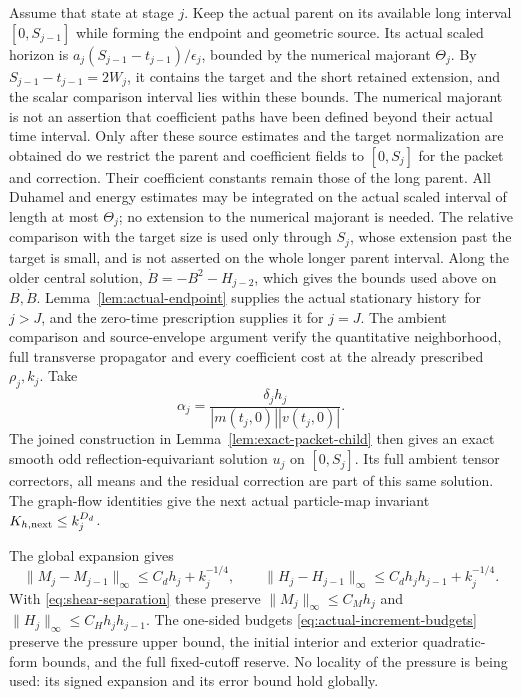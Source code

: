 Assume that state at stage $j$. Keep the actual parent on its available
long interval $[0,S_{j-1}]$ while forming the endpoint and geometric
source. Its actual scaled horizon is
$a_j(S_{j-1}-t_{j-1})/\epsilon_j$, bounded by the numerical majorant
$\Theta_j$. By $S_{j-1}-t_{j-1}=2W_j$, it contains the target and the
short retained extension, and the scalar comparison interval lies within these bounds.
The numerical majorant is not an assertion that coefficient paths have
been defined beyond their actual time interval. Only after these source
estimates and the target normalization are obtained do we restrict the
parent and coefficient fields to $[0,S_j]$ for the packet and correction.
Their coefficient constants remain those of the long parent.
All Duhamel and energy estimates may be integrated on the actual scaled
interval of length at most $\Theta_j$; no extension to the numerical
majorant is needed. The relative comparison with the target size is
used only through $S_j$, whose extension past the target is small,
and is not asserted on the whole longer parent interval. Along the
older central solution,
$\dot B=-B^2-H_{j-2}$, which gives the bounds used above on $B,\dot B$.
Lemma~\ref{lem:actual-endpoint} supplies the actual stationary history
for $j>J$, and the zero-time prescription supplies it for $j=J$.
The ambient comparison and source-envelope argument verify the
quantitative neighborhood, full transverse propagator and every
coefficient cost at the already prescribed $\rho_j,k_j$.
Take
\[
 \alpha_j=\frac{\delta_jh_j}{|m(t_j,0)||v(t_j,0)|}.
\]
The joined construction in Lemma~\ref{lem:exact-packet-child} then gives
an exact smooth odd reflection-equivariant solution $u_j$ on $[0,S_j]$.
Its full ambient tensor correctors, all means and the residual correction
are part of this same solution. The graph-flow identities give the
next actual particle-map invariant $K_{h,\rm next}\leq k_j^{D_d}$.

The global expansion gives
\[
 \|M_j-M_{j-1}\|_\infty\leq C_dh_j+k_j^{-1/4},\qquad
 \|H_j-H_{j-1}\|_\infty\leq C_dh_jh_{j-1}+k_j^{-1/4}.
\]
With \eqref{eq:shear-separation} these preserve
$\|M_j\|_\infty\leq C_Mh_j$ and
$\|H_j\|_\infty\leq C_Hh_jh_{j-1}$.
The one-sided budgets \eqref{eq:actual-increment-budgets} preserve the
pressure upper bound, the initial interior and exterior quadratic-form
bounds, and the full fixed-cutoff reserve. No locality of the pressure
is being used: its signed expansion and its error bound hold globally.

